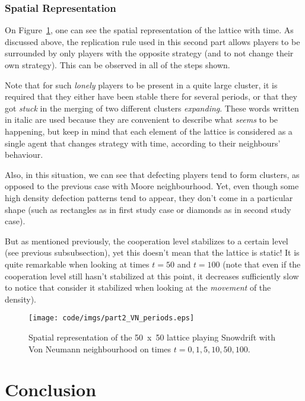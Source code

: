 \documentclass{article}
\begin{document}
\newpage

\subsubsection{Spatial Representation}

On Figure~\ref{fig:spatial representation part II VN}, one can see the spatial representation of the lattice
with time. As discussed above, the replication rule used in this second part allows players to be surrounded
by only players with the opposite strategy (and to not change their own strategy). This can be observed in
all of the steps shown.

Note that for such \textit{lonely} players to be present in a quite large cluster, it is required that they
either have been stable there for several periods, or that they got \textit{stuck} in the merging of two
different clusters \textit{expanding}. These words written in italic are used because they are convenient
to describe what \textit{seems} to be happening, but keep in mind that each element of the lattice is considered
as a single agent that changes strategy with time, according to their neighbours' behaviour.

Also, in this situation, we can see that defecting players tend to form clusters, as opposed to the previous
case with Moore neighbourhood. Yet, even though some high density defection patterns tend to appear, they don't
come in a particular shape (such as rectangles as in first study case or diamonds as in second study case).

But as mentioned previously, the cooperation level stabilizes to a certain level (see previous subsubsection),
yet this doesn't mean that the lattice is static! It is quite remarkable when looking at times $t=50$ and $t=100$
(note that even if the cooperation level still hasn't stabilized at this point, it decreases sufficiently
slow to notice that consider it stabilized when looking at the \textit{movement} of the density).

\begin{figure}[!t]
\hspace{-1.8cm}
\texttt{[image: code/imgs/part2\_VN\_periods.eps]}
\caption{Spatial representation of the 50~x~50 lattice playing Snowdrift with Von Neumann neighbourhood on
times $t=0,1,5,10,50,100$.\label{fig:spatial representation part II VN}}
\end{figure}

\section{Conclusion}
\end{document}
